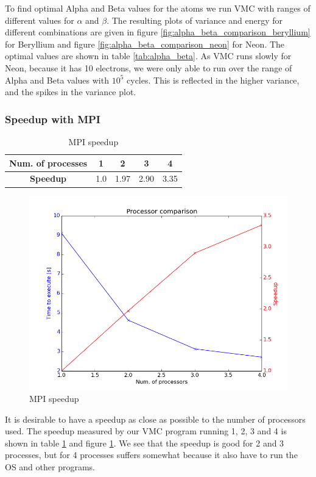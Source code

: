 \documentclass[x11names]{article}
\begin{document}
			To find optimal Alpha and Beta values for the atoms we run VMC with ranges of different values for \(\alpha\) and \(\beta\). The resulting plots of variance and energy for different combinations are given in figure \ref{fig:alpha_beta_comparison_beryllium} for Beryllium and figure \ref{fig:alpha_beta_comparison_neon} for Neon. The optimal values are shown in table \ref{tab:alpha_beta}. As VMC runs slowly for Neon, because it has 10 electrons, we were only able to run over the range of Alpha and Beta values with $10^{5}$ cycles. This is reflected in the higher variance, and the spikes in the variance plot.


		\subsubsection{Speedup with MPI}
			\begin{table}
			\center
					\begin{tabular}{| c | c| c| c| c|}
					    \hline
					   	\textbf{Num. of processes} &	1	&	2	&	3	&	4
					    \\ \hline
					    \textbf{Speedup}	&	1.0	&	1.97	&	2.90	&	3.35
					    \\	\hline
				  \end{tabular}
				  \caption{MPI speedup}
				  \label{tab:MPI_speedup}
			\end{table}

			\begin{figure}
			\centering \includegraphics[width=0.45\linewidth]{../figures/processor_number_time_comparison}
			\protect\caption{MPI speedup}
			\label{fig:MPI_speedup}
			\end{figure}

			It is desirable to have a speedup as close as possible to the number of processors used. The speedup measured by our VMC program running 1, 2, 3 and 4 is shown in table \ref{tab:MPI_speedup} and figure \ref{fig:MPI_speedup}. We see that the speedup is good for 2 and 3 processes, but for 4 processes suffers somewhat because it also have to run the OS and other programs.
\end{document}
